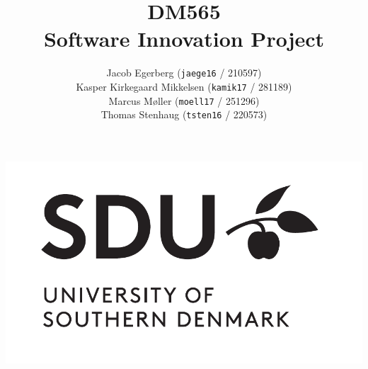 \documentclass[a4paper,]{article}
\begin{document}
\chead{}
\cfoot{}

\title{DM565\\Software Innovation Project}
\date{}
\author{
  Jacob Egerberg (\texttt{jaege16} / 210597) \\
  Kasper Kirkegaard Mikkelsen (\texttt{kamik17} / 281189) \\
  Marcus Møller (\texttt{moell17} / 251296) \\
  Thomas Stenhaug (\texttt{tsten16} / 220573)}

\maketitle

  \vspace*{\fill}
  \begin{center}
    \includegraphics[width=1.05\textwidth]{SDUlogo.pdf}
  \end{center}

\thispagestyle{empty}
\newpage
\end{document}
